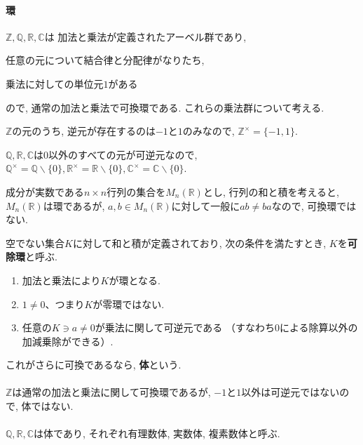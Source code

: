 \paragraph*{環}
$\mathbb{Z},\mathbb{Q},\mathbb{R},\mathbb{C}$は
加法と乗法が定義されたアーベル群であり,

任意の元について結合律と分配律がなりたち,

乗法に対しての単位元$1$がある

ので, 通常の加法と乗法で可換環である. これらの乗法群について考える.

$ \mathbb{Z} $の元のうち, 逆元が存在するのは$-1$と$1$のみなので, 
$\mathbb{Z}^\times = \{-1,1\} $.

$\mathbb{Q},\mathbb{R},\mathbb{C}$は$0$以外のすべての元が可逆元なので, 
$\mathbb{Q}^\times=\mathbb{Q}\backslash\{0\},\mathbb{R}^\times=\mathbb{R}\backslash\{0\},\mathbb{C}^\times=\mathbb{C}\backslash\{0\} $. \newline

成分が実数である$n\times n$行列の集合を$M_n(\mathbb{R}) $とし,
行列の和と積を考えると, $M_n(\mathbb{R})$は環であるが,
$a,b\in M_n(\mathbb{R})$に対して一般に$ab\neq ba$なので,
可換環ではない.\newline

\begin{dfn*}
	空でない集合$K$に対して和と積が定義されており,
	次の条件を満たすとき, $K$を\textbf{可除環}と呼ぶ.
	\begin{enumerate}[label=(\arabic*)\;]
		\item 加法と乗法により$K$が環となる.
		\item $1\neq0$、つまり$K$が零環ではない.
		\item 任意の$K\ni a\neq 0$が乗法に関して可逆元である
		（すなわち0による除算以外の加減乗除ができる）.
	\end{enumerate}
	これがさらに可換であるなら, \textbf{体}という.\newline
\end{dfn*}

\paragraph*{}
$\mathbb{Z}$は通常の加法と乗法に関して可換環であるが, 
$-1$と$1$以外は可逆元ではないので, 体ではない.

\paragraph*{}
$\mathbb{Q},\mathbb{R},\mathbb{C}$は体であり, 
それぞれ有理数体, 実数体, 複素数体と呼ぶ.\newline

